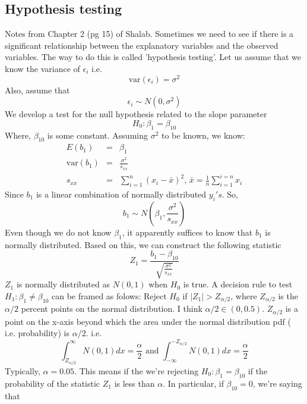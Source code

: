 \documentclass{article}
\newcommand{\beq}{\begin{equation}}
\newcommand{\eeq}{\end{equation}}
\newcommand{\ber}{\begin{eqnarray}}
\newcommand{\eer}{\end{eqnarray}}
\begin{document}
\subsection{Hypothesis testing}
Notes from Chapter 2 (pg 15) of Shalab. Sometimes we need to see if there is a significant relationship between the explanatory variables and the observed variables. The way to do this is called 'hypothesis testing'. Let us assume that we know the variance of $\epsilon_i$ i.e.
\beq
\text{var}(\epsilon_i) = \sigma^2
\eeq
Also, assume that
\beq
\epsilon_i \sim N(0,\sigma^2)
\eeq
We develop a test for the null hypothesis related to the slope parameter
\beq
H_0:\beta_1 = \beta_{10}
\eeq
Where, $\beta_{10}$ is some constant. Assuming $\sigma^2$ to be known, we know:
\ber
E(b_1)&=&\beta_1 \\
\text{var}(b_1) &=& \frac{\sigma^2}{s_{xx}}\\
s_{xx} &=& \sum_{i=1}^{n}(x_i - \bar{x})^2,\,\bar{x} = \frac{1}{n}\sum_{i=1}^{i=n}x_i
\eer
Since $b_1$ is a linear combination of normally distributed $y_i's$. So,
\beq
b_1 \sim N(\beta_1,\frac{\sigma^2}{s_{xx}})  
\eeq
Even though we do not know $\beta_1$, it apparently suffices to know that $b_1$ is normally distributed. Based on this, we can construct the following statistic
\beq
Z_1 = \frac{b_1-\beta_{10}}{\sqrt{\frac{\sigma^2}{s_{xx}}}}
\eeq
$Z_1$ is normally distributed as $N(0,1)$ when $H_0$ is true. A decision rule to test $H_1:\beta_1 \neq \beta_{10}$ can be framed as folows:
Reject $H_0$ if $|Z_1| > Z_{\alpha/2}$, where $Z_{\alpha/2}$ is the $\alpha/2$ percent points on the normal distribution. I think $\alpha/2 \in(0,0.5)$. $Z_{\alpha/2}$ is a point on the x-axis beyond which the area under the normal distribution pdf ( i.e. probability) is $\alpha/2$. i.e.
\beq
\int_{Z_{\alpha/2}}^{\infty}N(0,1)dx = \frac{\alpha}{2} \text{ and } \int_{-\infty}^{-Z_{\alpha/2}}N(0,1)dx = \frac{\alpha}{2}
\eeq
Typically, $\alpha = 0.05$. This means if the we're rejecting $H_0:\beta_1 = \beta_{10}$ if the probability of the statistic $Z_1$ is less than $\alpha$. In particular, if $\beta_{10}=0$, we're saying that 
\end{document}

